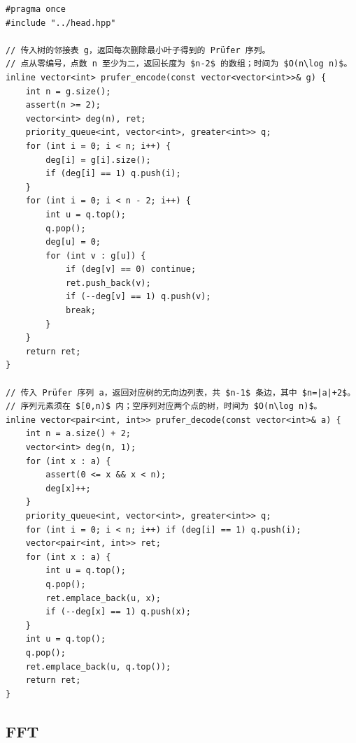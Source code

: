 \begin{lstlisting}
#pragma once
#include "../head.hpp"

// 传入树的邻接表 g，返回每次删除最小叶子得到的 Prüfer 序列。
// 点从零编号，点数 n 至少为二，返回长度为 $n-2$ 的数组；时间为 $O(n\log n)$。
inline vector<int> prufer_encode(const vector<vector<int>>& g) {
    int n = g.size();
    assert(n >= 2);
    vector<int> deg(n), ret;
    priority_queue<int, vector<int>, greater<int>> q;
    for (int i = 0; i < n; i++) {
        deg[i] = g[i].size();
        if (deg[i] == 1) q.push(i);
    }
    for (int i = 0; i < n - 2; i++) {
        int u = q.top();
        q.pop();
        deg[u] = 0;
        for (int v : g[u]) {
            if (deg[v] == 0) continue;
            ret.push_back(v);
            if (--deg[v] == 1) q.push(v);
            break;
        }
    }
    return ret;
}

// 传入 Prüfer 序列 a，返回对应树的无向边列表，共 $n-1$ 条边，其中 $n=|a|+2$。
// 序列元素须在 $[0,n)$ 内；空序列对应两个点的树，时间为 $O(n\log n)$。
inline vector<pair<int, int>> prufer_decode(const vector<int>& a) {
    int n = a.size() + 2;
    vector<int> deg(n, 1);
    for (int x : a) {
        assert(0 <= x && x < n);
        deg[x]++;
    }
    priority_queue<int, vector<int>, greater<int>> q;
    for (int i = 0; i < n; i++) if (deg[i] == 1) q.push(i);
    vector<pair<int, int>> ret;
    for (int x : a) {
        int u = q.top();
        q.pop();
        ret.emplace_back(u, x);
        if (--deg[x] == 1) q.push(x);
    }
    int u = q.top();
    q.pop();
    ret.emplace_back(u, q.top());
    return ret;
}
\end{lstlisting}

\subsection{FFT}
\par

